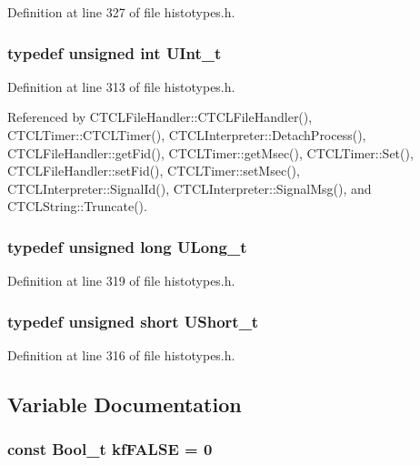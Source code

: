 Definition at line 327 of file histotypes.h.
\subsubsection{\setlength{\rightskip}{0pt plus 5cm}typedef unsigned int UInt\_\-t}\label{histotypes_8h_a2}




Definition at line 313 of file histotypes.h.

Referenced by CTCLFile\-Handler::CTCLFile\-Handler(), CTCLTimer::CTCLTimer(), CTCLInterpreter::Detach\-Process(), CTCLFile\-Handler::get\-Fid(), CTCLTimer::get\-Msec(), CTCLTimer::Set(), CTCLFile\-Handler::set\-Fid(), CTCLTimer::set\-Msec(), CTCLInterpreter::Signal\-Id(), CTCLInterpreter::Signal\-Msg(), and CTCLString::Truncate().
\subsubsection{\setlength{\rightskip}{0pt plus 5cm}typedef unsigned long ULong\_\-t}\label{histotypes_8h_a6}




Definition at line 319 of file histotypes.h.
\subsubsection{\setlength{\rightskip}{0pt plus 5cm}typedef unsigned short UShort\_\-t}\label{histotypes_8h_a4}




Definition at line 316 of file histotypes.h.

\subsection{Variable Documentation}
\subsubsection{\setlength{\rightskip}{0pt plus 5cm}const {\bf Bool\_\-t} kf\-FALSE = 0\hspace{0.3cm}{\tt  [static]}}\label{histotypes_8h_a17}




